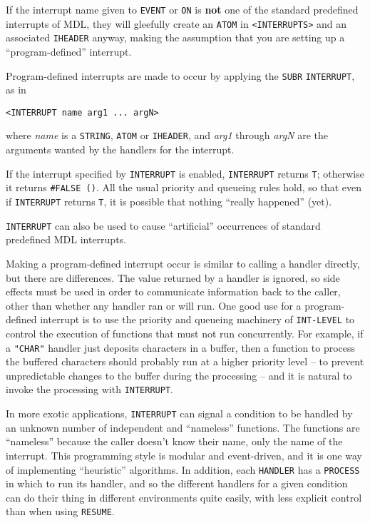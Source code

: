 \documentclass[a4paper]{scrbook}
\begin{document}
If the interrupt name given to \texttt{EVENT} or \texttt{ON} is \textbf{not} one of the standard predefined interrupts of
MDL, they will gleefully create an \texttt{ATOM} in \texttt{\textless{}INTERRUPTS\textgreater{}} and an associated
\texttt{IHEADER} anyway, making the assumption that you are setting up a ``program-defined'' interrupt.

Program-defined interrupts are made to occur by applying the \texttt{SUBR}
\texttt{INTERRUPT}, as in

\begin{verbatim}
<INTERRUPT name arg1 ... argN>
\end{verbatim}

where \emph{name} is a \texttt{STRING}, \texttt{ATOM} or \texttt{IHEADER}, and \emph{arg1} through \emph{argN} are the
arguments wanted by the handlers for the interrupt.

If the interrupt specified by \texttt{INTERRUPT} is enabled, \texttt{INTERRUPT} returns \texttt{T}; otherwise it returns
\texttt{\#FALSE\ ()}. All the usual priority and queueing rules hold, so that even if \texttt{INTERRUPT} returns
\texttt{T}, it is possible that nothing ``really happened'' (yet).

\texttt{INTERRUPT} can also be used to cause ``artificial'' occurrences of standard predefined MDL interrupts.

Making a program-defined interrupt occur is similar to calling a handler directly, but there are differences. The value
returned by a handler is ignored, so side effects must be used in order to communicate information back to the caller,
other than whether any handler ran or will run. One good use for a program-defined interrupt is to use the priority and
queueing machinery of \texttt{INT-LEVEL} to control the execution of functions that must not run concurrently. For example,
if a \texttt{"CHAR"} handler just deposits characters in a buffer, then a function to process the buffered characters
should probably run at a higher priority level -- to prevent unpredictable changes to the buffer during the processing --
and it is natural to invoke the processing with \texttt{INTERRUPT}.

In more exotic applications, \texttt{INTERRUPT} can signal a condition to be handled by an unknown number of independent
and ``nameless'' functions. The functions are ``nameless'' because the caller doesn't know their name, only the name of the
interrupt. This programming style is modular and event-driven, and it is one way of implementing ``heuristic'' algorithms.
In addition, each \texttt{HANDLER} has a \texttt{PROCESS} in which to run its handler, and so the
different handlers for a given condition can do their thing in different environments quite easily, with less explicit
control than when using \texttt{RESUME}.
\end{document}
